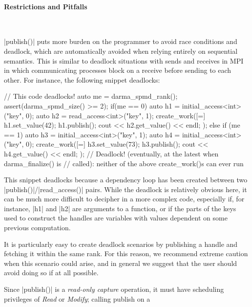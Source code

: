 \paragraph{Restrictions and Pitfalls}\mbox{}\\
\begin{compactitem}
  \item |publish()| puts more burden on the programmer to avoid race conditions and deadlock, 
  which are automatically avoided when relying entirely on sequential semantics.
  This is similar to deadlock situations with sends and receives in MPI in which communicating processes block on a receive before sending to each other.  
  For instance, the following snippet deadlocks:
  \begin{CppCode}
// This code deadlocks!
auto me = darma_spmd_rank();
assert(darma_spmd_size() >= 2);
if(me == 0) {
  auto h1 = initial_access<int>("key", 0);
  auto h2 = read_access<int>("key", 1);
  create_work([=]{ 
    h1.set_value(42);
    h1.publish();
    cout << h2.get_value() << endl;
  }); 
}
else if (me == 1) {
  auto h3 = initial_access<int>("key", 1);
  auto h4 = initial_access<int>("key", 0);
  create_work([=]{ 
    h3.set_value(73);
    h3.publish();
    cout << h4.get_value() << endl; 
  }); 
}
// Deadlock! (eventually, at the latest when darma_finalize() is
// called): neither of the above create_work()s can ever run
  \end{CppCode}
  This snippet deadlocks because a dependency loop has been created between two
  |publish()|/|read_access()| pairs. While the deadlock is
  relatively obvious here, it can be much more difficult to decipher in a more
  complex code, especially if, for instance, |h1| and |h2| are
  arguments to a function, or if the parts of the keys used to construct the
  handles are variables with values dependent on some previous computation.
  \item It is particularly easy to create deadlock scenarios by publishing a
  handle and fetching it within the same rank.  For this reason, we recommend
  extreme caution when this scenario could arise, and in general we suggest that
  the user should avoid doing so if at all possible.
  \item Since |publish()| is a {\it read-only capture} operation, it must
  have scheduling privileges of {\it Read} or {\it Modify}; calling publish on a

\end{compactitem}
